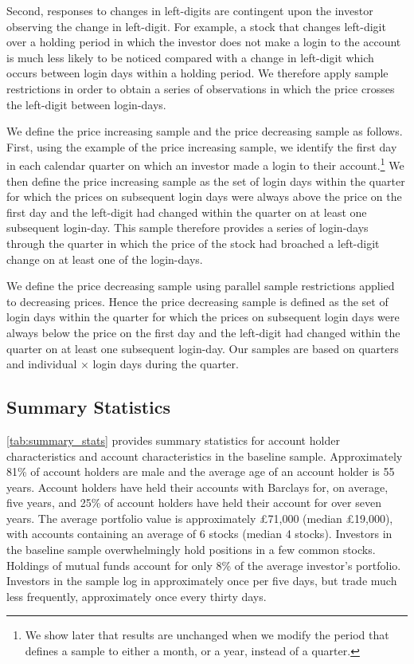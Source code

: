 Second, responses to changes in left-digits are contingent upon the investor observing the change in left-digit. For example, a stock that changes left-digit over a holding period in which the investor does not make a login to the account is much less likely to be noticed compared with a change in left-digit which occurs between login days within a holding period. We therefore apply sample restrictions in order to obtain a series of observations in which the price crosses the left-digit between login-days.

We define the price increasing sample and the price decreasing sample as follows. First, using the example of the price increasing sample, we identify the first day in each calendar quarter on which an investor made a login to their account.\footnote{We show later that results are unchanged when we modify the period that defines a sample to either a month, or a year, instead of a quarter.} We then define the price increasing sample as the set of login days within the quarter for which the prices on subsequent login days were always above the price on the first day and the left-digit had changed within the quarter on at least one subsequent login-day. This sample therefore provides a series of login-days through the quarter in which the price of the stock had broached a left-digit change on at least one of the login-days. 

We define the price decreasing sample using parallel sample restrictions applied to decreasing prices. Hence the price decreasing sample is defined as the set of login days within the quarter for which the prices on subsequent login days were always below the price on the first day and the left-digit had changed within the quarter on at least one subsequent login-day. Our samples are based on quarters and individual $\times$  login days during the quarter. 

\subsection{Summary Statistics}

\ref{tab:summary_stats} provides summary statistics for account holder characteristics and account characteristics in the baseline sample. Approximately 81\% of account holders are male and the average age of an account holder is 55 years. Account holders have held their accounts with Barclays for, on average, five years, and 25\% of account holders have held their account for over seven years. The average portfolio value is approximately \pounds71,000 (median \pounds19,000), with accounts containing an average of 6 stocks (median 4 stocks). Investors in the baseline sample overwhelmingly hold positions in a few common stocks. Holdings of mutual funds account for only 8\% of the average investor's portfolio. Investors in the sample log in approximately once per five days, but trade much less frequently, approximately once every thirty days.

